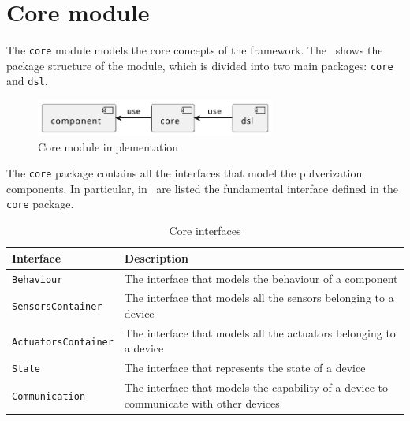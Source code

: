 
\section{Core module}
\label{sec:core-module-impl}

The \texttt{core} module models the core concepts of the framework. The~ shows the package structure of the module, which
is divided into two main packages: \texttt{core} and \texttt{dsl}.

\begin{figure}[ht]
	\centering
	\includegraphics[width=0.7\textwidth]{figures/core-package-diagram.pdf}
	\caption{Core module implementation}
	\label{fig:core-module-impl}
\end{figure}

The \texttt{core} package contains all the interfaces that model the pulverization components.
In particular, in~ are listed the fundamental interface defined in the \texttt{core} package.

\begin{table}[ht]
	\begin{tabularx}{\textwidth}{l X}
		\toprule
		Interface                   & Description                                                                            \\ \midrule
		\texttt{Behaviour}          & The interface that models the behaviour of a component                                 \\
		\texttt{SensorsContainer}   & The interface that models all the sensors belonging to a device                        \\
		\texttt{ActuatorsContainer} & The interface that models all the actuators belonging to a device                      \\
		\texttt{State}              & The interface that represents the state of a device                                    \\
		\texttt{Communication}      & The interface that models the capability of a device to communicate with other devices \\ \bottomrule
	\end{tabularx}
	\caption{Core interfaces}
	\label{tab:core-interfaces}
\end{table}

